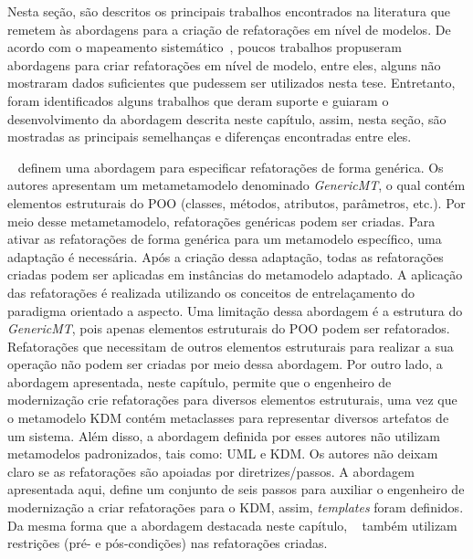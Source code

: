Nesta seção, são descritos os principais trabalhos encontrados na literatura que remetem às abordagens para a criação de refatorações em nível de modelos. De acordo com o mapeamento sistemático~\cite{durelli_systematic_mapping}, poucos trabalhos propuseram abordagens para criar refatorações em nível de modelo, entre eles, alguns não mostraram dados suficientes que pudessem ser utilizados nesta tese. Entretanto, foram identificados alguns trabalhos que deram suporte e guiaram o desenvolvimento da abordagem descrita neste capítulo, assim, nesta seção, são mostradas as principais semelhanças e diferenças encontradas entre eles.

~ definem uma abordagem para especificar refatorações de forma genérica. Os autores apresentam um metametamodelo denominado \textit{GenericMT}, o qual contém elementos estruturais do POO (classes, métodos, atributos, parâmetros, etc.). Por meio desse metametamodelo, refatorações genéricas podem ser criadas. Para ativar as refatorações de forma genérica para um metamodelo específico, uma adaptação é necessária. Após a criação dessa adaptação, todas as refatorações criadas podem ser aplicadas em instâncias do metamodelo adaptado. A aplicação das refatorações é realizada utilizando os conceitos de entrelaçamento do paradigma orientado a aspecto. Uma limitação dessa abordagem é a estrutura do \textit{GenericMT}, pois apenas elementos estruturais do POO podem ser refatorados. Refatorações que necessitam de outros elementos estruturais para realizar a sua operação não podem ser criadas por meio dessa abordagem. Por outro lado, a abordagem apresentada, neste capítulo, permite que o engenheiro de modernização crie refatorações para diversos elementos estruturais, uma vez que o metamodelo KDM contém metaclasses para representar diversos artefatos de um sistema. Além disso, a abordagem definida por esses autores não utilizam metamodelos padronizados, tais como: UML e KDM. Os autores não deixam claro se as refatorações são apoiadas por diretrizes/passos. A abordagem apresentada aqui, define um conjunto de seis passos para auxiliar o engenheiro de modernização a criar refatorações para o KDM, assim, \textit{templates} foram definidos. Da mesma forma que a abordagem destacada neste capítulo, ~ também utilizam restrições (pré- e pós-condições) nas refatorações criadas.

